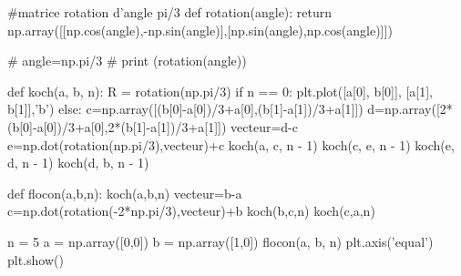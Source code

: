 \ifprof
\begin{corrige}
\begin{python}
#matrice rotation d'angle pi/3
def rotation(angle):
    return np.array([[np.cos(angle),-np.sin(angle)],[np.sin(angle),np.cos(angle)]])

# angle=np.pi/3    
# print (rotation(angle))

def koch(a, b, n):
    R = rotation(np.pi/3)
    if n == 0:
        plt.plot([a[0], b[0]], [a[1], b[1]],'b')
    else:
        c=np.array([(b[0]-a[0])/3+a[0],(b[1]-a[1])/3+a[1]])
        d=np.array([2*(b[0]-a[0])/3+a[0],2*(b[1]-a[1])/3+a[1]])
        vecteur=d-c
        e=np.dot(rotation(np.pi/3),vecteur)+c
        koch(a, c, n - 1)
        koch(c, e, n - 1)
        koch(e, d, n - 1)
        koch(d, b, n - 1)
        
def flocon(a,b,n):
    koch(a,b,n)
    vecteur=b-a
    c=np.dot(rotation(-2*np.pi/3),vecteur)+b
    koch(b,c,n)
    koch(c,a,n)

n = 5
a = np.array([0,0])
b = np.array([1,0])
flocon(a, b, n)
plt.axis('equal')
plt.show()
\end{python}
\end{corrige}
\else
\fi

